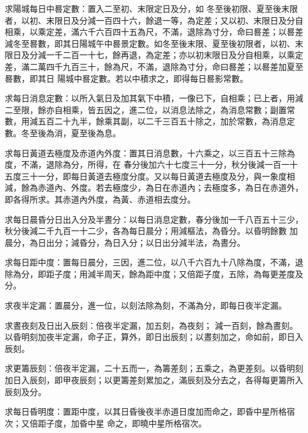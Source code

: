 \begin{pinyinscope}
 求陽城每日中晷定數：置入二至初、末限定日及分，如
 冬至後初限、夏至後末限者，以初、末限日及分減一百四十六，餘退一等，為定差；又以初、末限日及分自相乘，以乘定差，滿六千六百四十五為尺，不滿，退除為寸分，命曰晷差；以晷差減冬至晷數，即其日陽城午中晷景定數。如冬至後末限、夏至後初限者，以初、末限日及分減一千二百一十七，餘再退，為定差；亦以初末限日及分自相乘，以乘定差，滿二萬四千九百三十，餘為尺，不滿，退除為寸分，命曰晷差；以晷差加夏至晷數，即其日
 陽城中晷定數。若以中積求之，即得每日晷影常數。



 求每日消息定數：以所入氣日及加其氣下中積，一像已下，自相乘；已上者，用減二至限，餘亦自相乘，皆五因之，進二位，以消息法除之，為消息常數；副置常數，用減五百二十九半，餘乘其副，以二千三百五十除之，加於常數，為消息定數。冬至後為消，夏至後為息。



 求每日黃道去極度及赤道內外度：置其日消息數，十六乘之，以三百五十三除為度，不滿，退除為分，所得，在
 春分後加六十七度三十一分，秋分後減一百一十五度三十一分，即每日黃道去極度分度。又以每日黃道去極度及分，與一象度相減，餘為赤道內、外度。若去極度少，為日在赤道內；去極度多，為日在赤道外，即各得所求。其赤道內外度，為黃、赤道相去度分。



 求每日晨昏分日出入分及半晝分：以每日消息定數，春分後加一千八百五十三少，秋分後減二千九百一十二少，各為每日晨分；用減樞法，為昏分。以昏明餘數
 加晨分，為日出分；減昏分，為日入分；以日出分減半法，為晝分。



 求每日距中度：置每日晨分，三因，進二位，以八千六百九十八除為度，不滿，退除為分，即距子度；用減半周天，餘為距中度；又倍距子度，五除，為每更差度及分。



 求夜半定漏：置晨分，進一位，以刻法除為刻，不滿為分，即每日夜半定漏。



 求晝夜刻及日出入辰刻：倍夜半定漏，加五刻，為夜刻；
 減一百刻，餘為晝刻。以昏明刻加夜半定漏，命子正，算外，即日出辰刻；以晝刻加之，命如前，即日入辰刻。



 求更籌辰刻：倍夜半定漏，二十五而一，為籌差刻；五乘之，為更差刻。以昏明刻加日入辰刻，即甲夜辰刻；以更籌差刻累加之，滿辰刻及分去之，各得每更籌所入辰刻及分。



 求每日昏明度：置距中度，以其日昏後夜半赤道日度加而命之，即昏中星所格宿次；又倍距子度，加昏中星
 命之，即曉中星所格宿次。




\end{pinyinscope}
